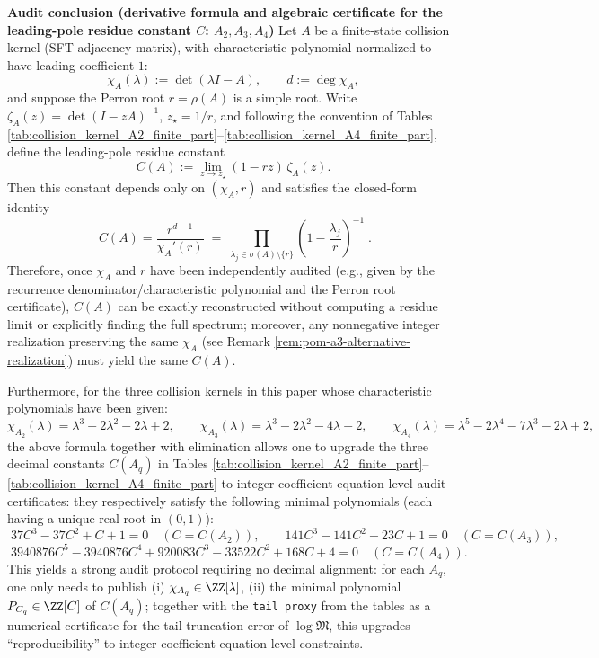 \par
\medskip\noindent\textbf{Audit conclusion (derivative formula and algebraic certificate for the leading-pole residue constant \(C\): \(A_2,A_3,A_4\))}
Let \(A\) be a finite-state collision kernel (SFT adjacency matrix), with characteristic polynomial normalized to have leading coefficient \(1\):
\[
\chi_A(\lambda):=\det(\lambda I-A),\qquad d:=\deg\chi_A,
\]
and suppose the Perron root \(r=\rho(A)\) is a simple root. Write
\(
\zeta_A(z)=\det(I-zA)^{-1}
\), \(z_\star=1/r\), and following the convention of Tables \ref{tab:collision_kernel_A2_finite_part}--\ref{tab:collision_kernel_A4_finite_part}, define the leading-pole residue constant
\[
C(A):=\lim_{z\to z_\star}(1-rz)\,\zeta_A(z).
\]
Then this constant depends only on \((\chi_A,r)\) and satisfies the closed-form identity
\[
\boxed{\;
C(A)=\frac{r^{d-1}}{\chi_A'(r)}
\;=\;
\prod_{\lambda_j\in\sigma(A)\setminus\{r\}}\left(1-\frac{\lambda_j}{r}\right)^{-1}\; }.
\]
Therefore, once \(\chi_A\) and \(r\) have been independently audited (e.g., given by the recurrence denominator/characteristic polynomial and the Perron root certificate), \(C(A)\) can be exactly reconstructed without computing a residue limit or explicitly finding the full spectrum; moreover, any nonnegative integer realization preserving the same \(\chi_A\) (see Remark \ref{rem:pom-a3-alternative-realization}) must yield the same \(C(A)\).
\par
Furthermore, for the three collision kernels in this paper whose characteristic polynomials have been given:
\[
\chi_{A_2}(\lambda)=\lambda^3-2\lambda^2-2\lambda+2,\qquad
\chi_{A_3}(\lambda)=\lambda^3-2\lambda^2-4\lambda+2,\qquad
\chi_{A_4}(\lambda)=\lambda^5-2\lambda^4-7\lambda^3-2\lambda+2,
\]
the above formula together with elimination allows one to upgrade the three decimal constants \(C(A_q)\) in Tables \ref{tab:collision_kernel_A2_finite_part}--\ref{tab:collision_kernel_A4_finite_part} to integer-coefficient equation-level audit certificates: they respectively satisfy the following minimal polynomials (each having a unique real root in \((0,1)\)):
\[
\boxed{\;
37C^3-37C^2+C+1=0\quad(C=C(A_2)),\qquad
141C^3-141C^2+23C+1=0\quad(C=C(A_3)),}
\]
\[
\boxed{\;
3940876C^5-3940876C^4+920083C^3-33522C^2+168C+4=0\quad(C=C(A_4)).}
\]
This yields a strong audit protocol requiring no decimal alignment: for each \(A_q\), one only needs to publish (i) \(\chi_{A_q}\in\ZZ[\lambda]\), (ii) the minimal polynomial \(P_{C_q}\in\ZZ[C]\) of \(C(A_q)\); together with the \texttt{tail proxy} from the tables as a numerical certificate for the tail truncation error of \(\log\mathfrak{M}\), this upgrades ``reproducibility'' to integer-coefficient equation-level constraints.


